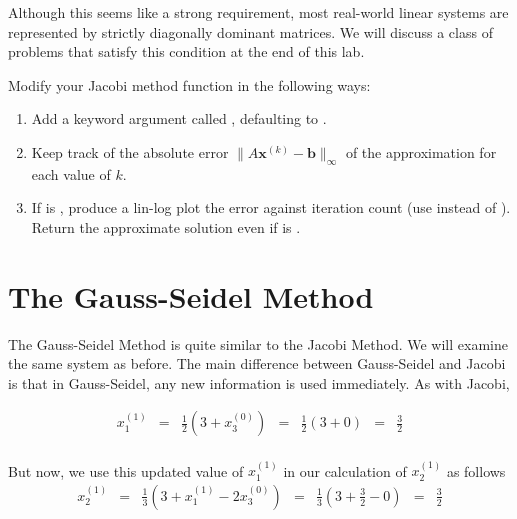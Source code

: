 Although this seems like a strong requirement, most real-world linear systems
are represented by strictly diagonally dominant matrices.
We will discuss a class of problems that satisfy this condition at the end of
this lab.

\begin{problem}
Modify your Jacobi method function in the following ways:
\begin{enumerate}
    \item Add a keyword argument called , defaulting to .
    \item Keep track of the absolute error $\|A\mathbf{x}^{(k)} - \mathbf{b}\|_{\infty}$ of the approximation for each value of $k$.
    \item If  is , produce a lin-log plot the error against iteration count (use  instead of ).
    Return the approximate solution even if  is .
\end{enumerate}

\end{problem}

\section*{The Gauss-Seidel Method} %

The Gauss-Seidel Method is quite similar to the Jacobi Method. We will examine
the same system as before. The main difference between Gauss-Seidel and Jacobi
is that in Gauss-Seidel, any new information is used immediately. As with Jacobi,

$$
\begin{matrix}
x^{(1)}_1 & = & \frac{1}{2} ( 3 + x^{(0)}_3)  & = & \frac{1}{2} (3 + 0)     & = & \frac{3}{2} \\
\end{matrix}
$$

But now, we use this updated value of $x^{(1)}_1$ in our calculation of
$x^{(1)}_2$ as follows
$$
\begin{matrix}
x^{(1)}_2 & = & \frac{1}{3} ( 3 + x^{(1)}_1 - 2x^{(0)}_3) & = & \frac{1}{3} (3 + \frac{3}{2} - 0) & = & \frac{3}{2} \\
\end{matrix}
$$

